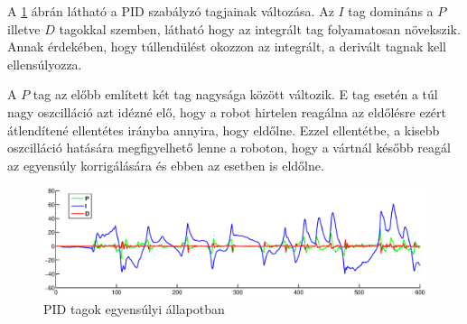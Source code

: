 A \ref{pidFig} ábrán látható a PID szabályzó tagjainak változása. Az $I$ tag domináns a $P$ illetve $D$ tagokkal szemben, látható hogy az integrált tag folyamatosan növekszik. Annak érdekében, hogy túllendülést okozzon az integrált, a derivált tagnak kell ellensúlyozza.

A $P$ tag az előbb említett két tag nagysága között változik. E tag esetén a túl nagy oszcilláció azt idézné elő, hogy a robot hirtelen reagálna az eldőlésre ezért átlendítené ellentétes irányba annyira, hogy eldőlne. Ezzel ellentétbe, a kisebb oszcilláció hatására megfigyelhető lenne a roboton, hogy a vártnál később reagál az egyensúly korrigálására és ebben az esetben is eldőlne.

\begin{figure}[!htb]
	\begin{center}
		\includegraphics[width=1.0\linewidth]{images/pid.eps}
	\end{center}
	\caption{PID tagok egyensúlyi állapotban}
	\label{pidFig}
\end{figure}
